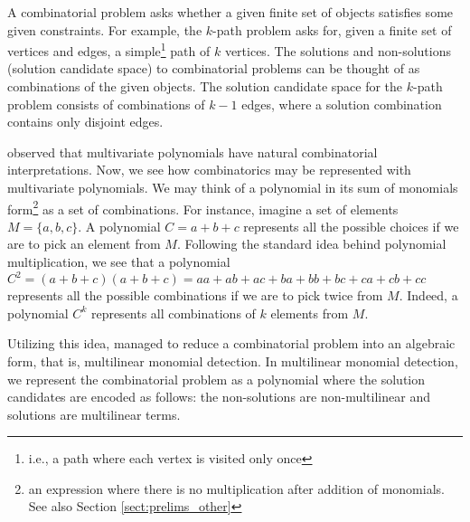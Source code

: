 A combinatorial problem asks whether a given 
finite set of objects satisfies some given constraints. 
For example, the $k$-path problem asks for, given a finite set of vertices and edges, 
a simple\footnote{i.e., a path where each vertex is visited only once} path of $k$ vertices. 
The solutions and non-solutions (solution candidate space) 
to combinatorial problems can be thought of as 
combinations of the given objects. 
The solution candidate space for the $k$-path problem 
consists of combinations of $k-1$ edges, where 
a solution combination contains only disjoint edges.
%


\citeauthor{Valiant92} \cite{Valiant92} observed that 
multivariate polynomials have natural combinatorial interpretations. 
Now, we see how combinatorics may be represented with multivariate polynomials. 
We may think of a polynomial in its sum of monomials 
form\footnote{an expression where there is no multiplication 
after addition of monomials. See also Section \ref{sect:prelims_other}} 
as a set of combinations. For instance, imagine a set of elements $M = \{a, b, c\}$. 
A polynomial $C = a+b+c$ represents all the possible choices 
if we are to pick an element from $M$. Following the standard idea behind polynomial 
multiplication, we see that a polynomial 
$C^2 = (a+b+c)(a+b+c) = aa + ab + ac + ba + bb + bc + ca + cb + cc$ represents 
all the possible combinations if we are to pick twice from $M$. 
Indeed, a polynomial $C^k$ represents all combinations of $k$ elements from $M$.

Utilizing this idea, \citeauthor{Koutis05} \cite{Koutis05} 
managed to reduce a combinatorial problem 
into an algebraic form, that is, multilinear monomial detection. 
In multilinear monomial detection, we represent the combinatorial problem 
as a polynomial where the solution candidates are encoded as follows: 
the non-solutions are non-multilinear and solutions are multilinear terms. 

